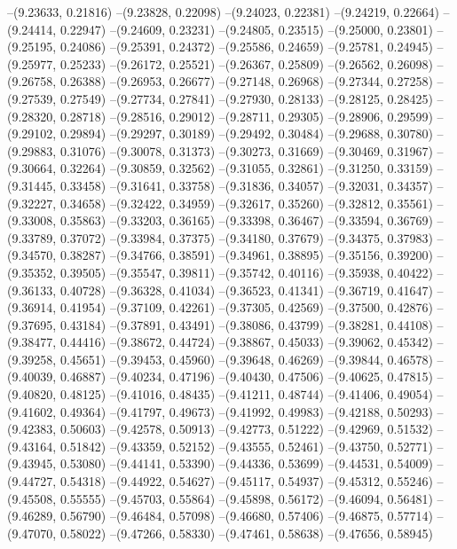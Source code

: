 --(9.23633, 0.21816)
--(9.23828, 0.22098)
--(9.24023, 0.22381)
--(9.24219, 0.22664)
--(9.24414, 0.22947)
--(9.24609, 0.23231)
--(9.24805, 0.23515)
--(9.25000, 0.23801)
--(9.25195, 0.24086)
--(9.25391, 0.24372)
--(9.25586, 0.24659)
--(9.25781, 0.24945)
--(9.25977, 0.25233)
--(9.26172, 0.25521)
--(9.26367, 0.25809)
--(9.26562, 0.26098)
--(9.26758, 0.26388)
--(9.26953, 0.26677)
--(9.27148, 0.26968)
--(9.27344, 0.27258)
--(9.27539, 0.27549)
--(9.27734, 0.27841)
--(9.27930, 0.28133)
--(9.28125, 0.28425)
--(9.28320, 0.28718)
--(9.28516, 0.29012)
--(9.28711, 0.29305)
--(9.28906, 0.29599)
--(9.29102, 0.29894)
--(9.29297, 0.30189)
--(9.29492, 0.30484)
--(9.29688, 0.30780)
--(9.29883, 0.31076)
--(9.30078, 0.31373)
--(9.30273, 0.31669)
--(9.30469, 0.31967)
--(9.30664, 0.32264)
--(9.30859, 0.32562)
--(9.31055, 0.32861)
--(9.31250, 0.33159)
--(9.31445, 0.33458)
--(9.31641, 0.33758)
--(9.31836, 0.34057)
--(9.32031, 0.34357)
--(9.32227, 0.34658)
--(9.32422, 0.34959)
--(9.32617, 0.35260)
--(9.32812, 0.35561)
--(9.33008, 0.35863)
--(9.33203, 0.36165)
--(9.33398, 0.36467)
--(9.33594, 0.36769)
--(9.33789, 0.37072)
--(9.33984, 0.37375)
--(9.34180, 0.37679)
--(9.34375, 0.37983)
--(9.34570, 0.38287)
--(9.34766, 0.38591)
--(9.34961, 0.38895)
--(9.35156, 0.39200)
--(9.35352, 0.39505)
--(9.35547, 0.39811)
--(9.35742, 0.40116)
--(9.35938, 0.40422)
--(9.36133, 0.40728)
--(9.36328, 0.41034)
--(9.36523, 0.41341)
--(9.36719, 0.41647)
--(9.36914, 0.41954)
--(9.37109, 0.42261)
--(9.37305, 0.42569)
--(9.37500, 0.42876)
--(9.37695, 0.43184)
--(9.37891, 0.43491)
--(9.38086, 0.43799)
--(9.38281, 0.44108)
--(9.38477, 0.44416)
--(9.38672, 0.44724)
--(9.38867, 0.45033)
--(9.39062, 0.45342)
--(9.39258, 0.45651)
--(9.39453, 0.45960)
--(9.39648, 0.46269)
--(9.39844, 0.46578)
--(9.40039, 0.46887)
--(9.40234, 0.47196)
--(9.40430, 0.47506)
--(9.40625, 0.47815)
--(9.40820, 0.48125)
--(9.41016, 0.48435)
--(9.41211, 0.48744)
--(9.41406, 0.49054)
--(9.41602, 0.49364)
--(9.41797, 0.49673)
--(9.41992, 0.49983)
--(9.42188, 0.50293)
--(9.42383, 0.50603)
--(9.42578, 0.50913)
--(9.42773, 0.51222)
--(9.42969, 0.51532)
--(9.43164, 0.51842)
--(9.43359, 0.52152)
--(9.43555, 0.52461)
--(9.43750, 0.52771)
--(9.43945, 0.53080)
--(9.44141, 0.53390)
--(9.44336, 0.53699)
--(9.44531, 0.54009)
--(9.44727, 0.54318)
--(9.44922, 0.54627)
--(9.45117, 0.54937)
--(9.45312, 0.55246)
--(9.45508, 0.55555)
--(9.45703, 0.55864)
--(9.45898, 0.56172)
--(9.46094, 0.56481)
--(9.46289, 0.56790)
--(9.46484, 0.57098)
--(9.46680, 0.57406)
--(9.46875, 0.57714)
--(9.47070, 0.58022)
--(9.47266, 0.58330)
--(9.47461, 0.58638)
--(9.47656, 0.58945)
